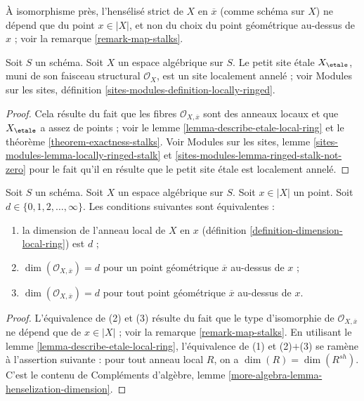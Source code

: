 \noindent
À isomorphisme près, l'hensélisé strict de $X$ en $\overline{x}$
(comme schéma sur $X$) ne dépend que du point $x \in |X|$, et non
du choix du point géométrique au-dessus de $x$ ; voir la
remarque \ref{remark-map-stalks}.

\begin{lemma}
\label{lemma-etale-site-locally-ringed}
Soit $S$ un schéma.
Soit $X$ un espace algébrique sur $S$.
Le petit site \'etale $X_\etale$, muni de son
faisceau structural $\mathcal{O}_X$, est un site localement annelé ; voir
Modules sur les sites, définition \ref{sites-modules-definition-locally-ringed}.
\end{lemma}

\begin{proof}
Cela résulte du fait que les fibres
$\mathcal{O}_{X, \overline{x}}$ sont
des anneaux locaux et que $X_\etale$ a assez de points ; voir le
lemme \ref{lemma-describe-etale-local-ring} et le
théorème \ref{theorem-exactness-stalks}.
Voir
Modules sur les sites, lemme \ref{sites-modules-lemma-locally-ringed-stalk} et
\ref{sites-modules-lemma-ringed-stalk-not-zero}
pour le fait qu'il en résulte que le petit site \'etale est localement annelé.
\end{proof}

\begin{lemma}
\label{lemma-dimension-local-ring}
Soit $S$ un schéma. Soit $X$ un espace algébrique sur $S$.
Soit $x \in |X|$ un point. Soit $d \in \{0, 1, 2, \ldots, \infty\}$.
Les conditions suivantes sont équivalentes :
\begin{enumerate}
\item la dimension de l'anneau local de $X$ en $x$
(définition \ref{definition-dimension-local-ring}) est $d$ ;
\item $\dim(\mathcal{O}_{X, \overline{x}}) = d$ pour un point
géométrique $\overline{x}$ au-dessus de $x$ ;
\item $\dim(\mathcal{O}_{X, \overline{x}}) = d$ pour tout point
géométrique $\overline{x}$ au-dessus de $x$.
\end{enumerate}
\end{lemma}

\begin{proof}
L'équivalence de (2) et (3) résulte du fait que le
type d'isomorphie de $\mathcal{O}_{X, \overline{x}}$ ne dépend que
de $x \in |X|$ ; voir la remarque \ref{remark-map-stalks}.
En utilisant le lemme \ref{lemma-describe-etale-local-ring},
l'équivalence de (1) et (2)$+$(3) se ramène à
l'assertion suivante : pour tout anneau local $R$, on a
$\dim(R) = \dim(R^{sh})$. C'est le contenu de
Compléments d'algèbre, lemme \ref{more-algebra-lemma-henselization-dimension}.
\end{proof}

